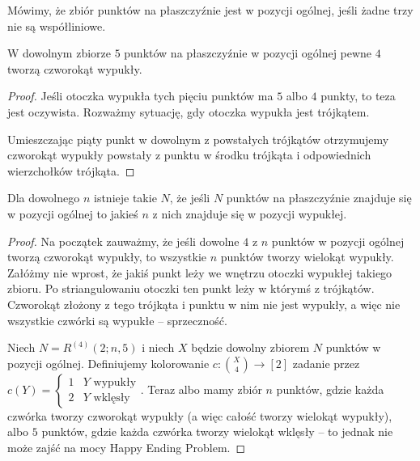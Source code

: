 \begin{definition}
	Mówimy, że zbiór punktów na płaszczyźnie jest w pozycji ogólnej, jeśli żadne trzy nie są współliniowe.
\end{definition}

\begin{theorem}
	W dowolnym zbiorze \(5\) punktów na płaszczyźnie w pozycji ogólnej pewne \(4\) tworzą czworokąt wypukły.
\end{theorem}
\begin{proof}
	Jeśli otoczka wypukła tych pięciu punktów ma \(5\) albo \(4\) punkty, to teza jest oczywista. Rozważmy sytuację, gdy otoczka wypukła jest trójkątem.
	\begin{center}
	\end{center}
	Umieszczając piąty punkt w dowolnym z powstałych trójkątów otrzymujemy czworokąt wypukły powstały z punktu w środku trójkąta i odpowiednich wierzchołków trójkąta.
\end{proof}

\begin{theorem}
	Dla dowolnego \(n\) istnieje takie \(N\), że jeśli \(N\) punktów na płaszczyźnie znajduje się w pozycji ogólnej to jakieś \(n\) z nich znajduje się w pozycji wypukłej.
\end{theorem}

\begin{proof}
	Na początek zauważmy, że jeśli dowolne \(4\) z \(n\) punktów w pozycji ogólnej tworzą czworokąt wypukły, to wszystkie \(n\) punktów tworzy wielokąt wypukły. Załóżmy nie wprost, że jakiś punkt leży we wnętrzu otoczki wypukłej takiego zbioru. Po striangulowaniu otoczki ten punkt leży w którymś z trójkątów. Czworokąt złożony z tego trójkąta i punktu w nim nie jest wypukły, a więc nie wszystkie czwórki są wypukłe -- sprzeczność.

	Niech \(N = R^{(4)}(2;n,5)\) i niech \(X\) będzie dowolny zbiorem \(N\) punktów w pozycji ogólnej. Definiujemy kolorowanie \(c:\binom{X}{4}\to [2]\) zadanie przez \(c(Y) = \left\{\begin{array}{lr}
		1 & Y \text{ wypukły} \\
		2 & Y \text{ wklęsły}
	\end{array}\right.\).
	Teraz albo mamy zbiór \(n\) punktów, gdzie każda czwórka tworzy czworokąt wypukły (a więc całość tworzy wielokąt wypukły), albo \(5\) punktów, gdzie każda czwórka tworzy wielokąt wklęsły -- to jednak nie może zajść na mocy Happy Ending Problem.
\end{proof}

